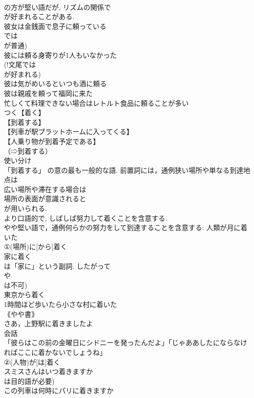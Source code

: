 \documentclass[8pt]{extreport}
\begin{document}
\begin{CJK}{UTF8}{min}
\\	の方が堅い語だが, リズムの関係で 
\\	が好まれることがある.
\\	彼女は金銭面で息子に頼っている
\\	では 
\\	が普通)
\\	彼には頼る身寄りが1人もいなかった
\\	(!文尾では 
\\	が好まれる)
\\	彼は気がめいるといつも酒に頼る
\\	彼は親戚を頼って福岡に来た
\\	忙しくて料理できない場合はレトルト食品に頼ることが多い
\\	つく【着く】
\\	【到着する】
\\	【列車が駅プラットホームに入ってくる】
\\	【人乗り物が到着予定である】
\\	（⇨到着する）
\\	使い分け
\\	「到着する」 の意の最も一般的な語. 前置詞には，通例狭い場所や単なる到達地点は 
\\	広い場所や滞在する場合は 
\\	場所の表面が意識されると 
\\	が用いられる.
\\	より口語的で, しばしば努力して着くことを含意する.
\\	やや堅い語で，通例何らかの努力をして到達することを含意する: 人類が月に着いた 
\\	①(場所)に[から]着く
\\	家に着く
\\	は「家に」という副詞. したがって 
\\	や 
\\	は不可)
\\	東京から着く
\\	1時間ほど歩いたら小さな村に着いた
\\	｟やや書｠
\\	さあ，上野駅に着きましたよ
\\	会話
\\	「彼らはこの前の金曜日にシドニーを発ったんだよ」「じゃああしたにならなければここに着かないでしょうね」
\\	②(人物)が[は]着く
\\	スミスさんはいつ着きますか
\\	は目的語が必要) 
\\	この列車は何時にパリに着きますか

\end{CJK}
\end{document}
